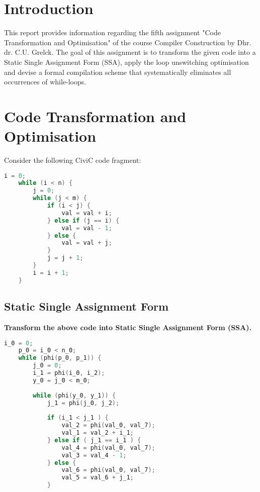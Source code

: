 \documentclass[hidelinks]{uva-inf-article}
\begin{document}
\section{Introduction}
\begin{flushleft}
\par This report provides information regarding the fifth assignment 
"Code Transformation and Optimisation" of the course Compiler Construction by Dhr.
dr. C.U. Grelck. The goal of this assignment is to transform the given code into 
a Static Single Assignment Form (SSA), apply the loop unswitching optimisation and
devise a formal compilation scheme that systematically eliminates all occurrences of 
while-loops.

\newpage
\section{Code Transformation and Optimisation}
Consider the following CiviC code fragment:
\begin{lstlisting}[basicstyle=\small, language=C, label=lst:code, caption=CiviC code fragment, captionpos=b]
    i = 0;
    while (i < n) {
        j = 0;
        while (j < m) {
            if (i < j) {
                val = val + i;
            } else if (j == i) {
                val = val - 1;
            } else {
                val = val + j;
            }
            j = j + 1;
        }
        i = i + 1;
    }
\end{lstlisting}

\subsection{Static Single Assignment Form}
\textbf{Transform the above code into Static Single Assignment Form (SSA).}

\begin{lstlisting}[basicstyle=\small, language=C, label=lst:code, caption=Static Single Assignment Form (SSA), captionpos=b]
    i_0 = 0;
    p_0 = i_0 < n_0;
    while (phi(p_0, p_1)) {
        j_0 = 0;
        i_1 = phi(i_0, i_2);
        y_0 = j_0 < m_0;
    
        while (phi(y_0, y_1)) {
            j_1 = phi(j_0, j_2);
    
            if (i_1 < j_1 ) {
                val_2 = phi(val_0, val_7);
                val_1 = val_2 + i_1;
            } else if ( j_1 == i_1 ) {
                val_4 = phi(val_0, val_7);
                val_3 = val_4 - 1;
            } else {
                val_6 = phi(val_0, val_7);
                val_5 = val_6 + j_1; 
            }
    

\end{lstlisting}
\end{flushleft}
\end{document}
